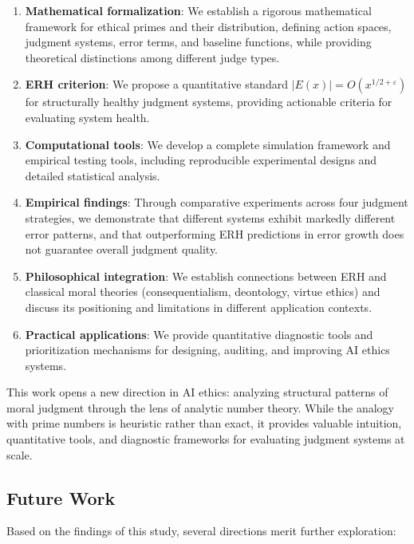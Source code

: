 \documentclass[12pt,a4paper]{article}
\theoremstyle{definition}
\theoremstyle{remark}
\begin{document}
\begin{enumerate}
    \item \textbf{Mathematical formalization}: We establish a rigorous mathematical framework for ethical primes and their distribution, defining action spaces, judgment systems, error terms, and baseline functions, while providing theoretical distinctions among different judge types.
    \item \textbf{ERH criterion}: We propose a quantitative standard $|E(x)| = O(x^{1/2+\varepsilon})$ for structurally healthy judgment systems, providing actionable criteria for evaluating system health.
    \item \textbf{Computational tools}: We develop a complete simulation framework and empirical testing tools, including reproducible experimental designs and detailed statistical analysis.
    \item \textbf{Empirical findings}: Through comparative experiments across four judgment strategies, we demonstrate that different systems exhibit markedly different error patterns, and that outperforming ERH predictions in error growth does not guarantee overall judgment quality.
    \item \textbf{Philosophical integration}: We establish connections between ERH and classical moral theories (consequentialism, deontology, virtue ethics) and discuss its positioning and limitations in different application contexts.
    \item \textbf{Practical applications}: We provide quantitative diagnostic tools and prioritization mechanisms for designing, auditing, and improving AI ethics systems.
\end{enumerate}

This work opens a new direction in AI ethics: analyzing structural patterns of moral judgment through the lens of analytic number theory. While the analogy with prime numbers is heuristic rather than exact, it provides valuable intuition, quantitative tools, and diagnostic frameworks for evaluating judgment systems at scale.

\subsection{Future Work}

Based on the findings of this study, several directions merit further exploration:
\end{document}
